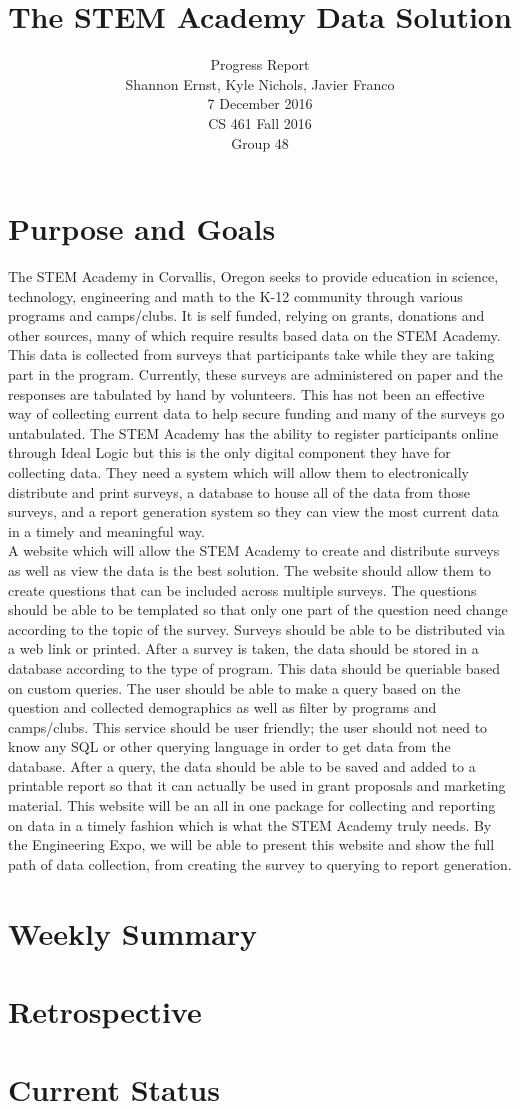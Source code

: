 \documentclass[letterpaper,10pt,serif, draftclsnofoot,onecolumn, compsoc, titlepage]{IEEEtran}
\title{The STEM Academy Data Solution}
\author{Progress Report \\ Shannon Ernst, Kyle Nichols, Javier Franco\\ 7 December 2016\\ CS 461 Fall 2016\\ Group 48}
\begin{document}
\maketitle
\newpage
\section{Purpose and Goals}
The STEM Academy in Corvallis, Oregon seeks to provide education in science, technology, engineering and math to the K-12 community through various programs and camps/clubs. It is self funded, relying on grants, donations and other sources, many of which require results based data on the STEM Academy. This data is collected from surveys that participants take while they are taking part in the program. Currently, these surveys are administered on paper and the responses are tabulated by hand by volunteers. This has not been an effective way of collecting current data to help secure funding and many of the surveys go untabulated. The STEM Academy has the ability to register participants online through Ideal Logic but this is the only digital component they have for collecting data. They need a system which will allow them to electronically distribute and print surveys, a database to house all of the data from those surveys, and a report generation system so they can view the most current data in a timely and meaningful way.\\
A website which will allow the STEM Academy to create and distribute surveys as well as view the data is the best solution. The website should allow them to create questions that can be included across multiple surveys. The questions should be able to be templated so that only one part of the question need change according to the topic of the survey. Surveys should be able to be distributed via a web link or printed. After a survey is taken, the data should be stored in a database according to the type of program. This data should be queriable based on custom queries. The user should be able to make a query based on the question and collected demographics as well as filter by programs and camps/clubs. This service should be user friendly; the user should not need to know any SQL or other querying language in order to get data from the database. After a query, the data should be able to be saved and added to a printable report so that it can actually be used in grant proposals and marketing material. This website will be an all in one package for collecting and reporting on data in a timely fashion which is what the STEM Academy truly needs. By the Engineering Expo, we will be able to present this website and show the full path of data collection, from creating the survey to querying to report generation.

\section{Weekly Summary}

\section{Retrospective}
\section{Current Status}
\end{document}

